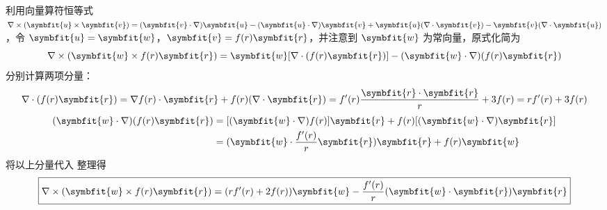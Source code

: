 \begin{solution}
    利用向量算符恒等式 $\nabla \times (\symbfit{u} \times \symbfit{v}) = (\symbfit{v} \cdot \nabla)\symbfit{u} - (\symbfit{u} \cdot \nabla)\symbfit{v} + \symbfit{u}(\nabla \cdot \symbfit{v}) - \symbfit{v}(\nabla \cdot \symbfit{u})$，令 $\symbfit{u} = \symbfit{w}$，$\symbfit{v} = f(r)\symbfit{r}$，并注意到 $\symbfit{w}$ 为常向量，原式化简为
    \begin{equation}
        \label{eq:curl-expansion}
        \nabla \times (\symbfit{w} \times f(r)\symbfit{r}) = \symbfit{w} [\nabla \cdot (f(r)\symbfit{r})] - (\symbfit{w} \cdot \nabla)(f(r)\symbfit{r})
    \end{equation}
    分别计算两项分量：
    \begin{equation}
        \nabla \cdot (f(r)\symbfit{r}) = \nabla f(r) \cdot \symbfit{r} + f(r) (\nabla \cdot \symbfit{r}) = f'(r) \frac{\symbfit{r} \cdot \symbfit{r}}{r} + 3f(r) = r f'(r) + 3f(r)
    \end{equation}
    \begin{equation}
        \begin{aligned}
            (\symbfit{w} \cdot \nabla)(f(r)\symbfit{r}) & = [(\symbfit{w} \cdot \nabla) f(r)]\symbfit{r} + f(r) [(\symbfit{w} \cdot \nabla)\symbfit{r}] \\
                                                        & = (\symbfit{w} \cdot \frac{f'(r)}{r}\symbfit{r})\symbfit{r} + f(r) \symbfit{w}
        \end{aligned}
    \end{equation}
    将以上分量代入  整理得
    \begin{equation}
        \boxed{\nabla \times (\symbfit{w} \times f(r)\symbfit{r}) = (r f'(r) + 2f(r))\symbfit{w} - \frac{f'(r)}{r}(\symbfit{w} \cdot \symbfit{r})\symbfit{r}}
    \end{equation}
\end{solution}


